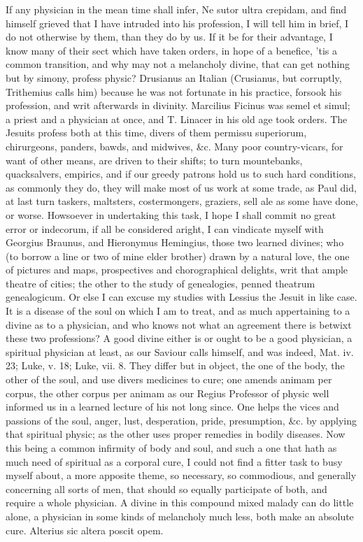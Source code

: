 {If any physician in the mean time shall infer, Ne sutor ultra crepidam,
and find himself grieved that I have intruded into his profession, I
will tell him in brief, I do not otherwise by them, than they do by us.
If it be for their advantage, I know many of their sect which have
taken orders, in hope of a benefice, 'tis a common transition, and why
may not a melancholy divine, that can get nothing but by simony,
profess physic? Drusianus an Italian (Crusianus, but corruptly,
Trithemius calls him) because he was not fortunate in his
practice, forsook his profession, and writ afterwards in divinity.
Marcilius Ficinus was semel et simul; a priest and a physician at once,
and T. Linacer in his old age took orders. The Jesuits profess
both at this time, divers of them permissu superiorum, chirurgeons,
panders, bawds, and midwives, \&c. Many poor country-vicars, for want of
other means, are driven to their shifts; to turn mountebanks,
quacksalvers, empirics, and if our greedy patrons hold us to such hard
conditions, as commonly they do, they will make most of us work at some
trade, as Paul did, at last turn taskers, maltsters, costermongers,
graziers, sell ale as some have done, or worse. Howsoever in
undertaking this task, I hope I shall commit no great error or
indecorum, if all be considered aright, I can vindicate myself with
Georgius Braunus, and Hieronymus Hemingius, those two learned divines;
who (to borrow a line or two of mine elder brother) drawn by a
natural love, the one of pictures and maps, prospectives and
chorographical delights, writ that ample theatre of cities; the other
to the study of genealogies, penned theatrum genealogicum. Or else I
can excuse my studies with Lessius the Jesuit in like case. It is
a disease of the soul on which I am to treat, and as much appertaining
to a divine as to a physician, and who knows not what an agreement
there is betwixt these two professions? A good divine either is or
ought to be a good physician, a spiritual physician at least, as our
Saviour calls himself, and was indeed, Mat. iv. 23; Luke, v. 18; Luke,
vii. 8. They differ but in object, the one of the body, the other of
the soul, and use divers medicines to cure; one amends animam per
corpus, the other corpus per animam as our Regius Professor of
physic well informed us in a learned lecture of his not long since. One
helps the vices and passions of the soul, anger, lust, desperation,
pride, presumption, \&c. by applying that spiritual physic; as the other
uses proper remedies in bodily diseases. Now this being a common
infirmity of body and soul, and such a one that hath as much need of
spiritual as a corporal cure, I could not find a fitter task to busy
myself about, a more apposite theme, so necessary, so commodious, and
generally concerning all sorts of men, that should so equally
participate of both, and require a whole physician. A divine in this
compound mixed malady can do little alone, a physician in some kinds of
melancholy much less, both make an absolute cure.
Alterius sic altera poscit opem.

}
